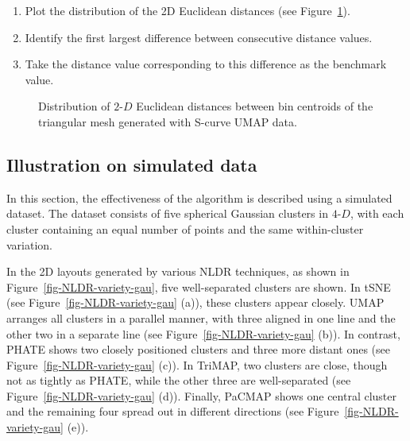 \documentclass[
  12pt]{article}
\providecommand{\tightlist}{%
  \setlength{\itemsep}{0pt}\setlength{\parskip}{0pt}}\usepackage{longtable,booktabs,array}
\def\tightlist{}
\begin{document}
\begin{enumerate}
\def\labelenumi{\arabic{enumi}.}
\tightlist
\item
  Plot the distribution of the 2D Euclidean distances (see
  Figure~\ref{fig-dist-scurve}).
\item
  Identify the first largest difference between consecutive distance
  values.
\item
  Take the distance value corresponding to this difference as the
  benchmark value.
\end{enumerate}

\begin{figure}[H]


\caption{\label{fig-dist-scurve}Distribution of \(2\text{-}D\) Euclidean
distances between bin centroids of the triangular mesh generated with
S-curve UMAP data.}

\end{figure}%

\subsection{Illustration on simulated
data}\label{illustration-on-simulated-data}

In this section, the effectiveness of the algorithm is described using a
simulated dataset. The dataset consists of five spherical Gaussian
clusters in \(4\text{-}D\), with each cluster containing an equal number
of points and the same within-cluster variation.

In the 2D layouts generated by various NLDR techniques, as shown in
Figure~\ref{fig-NLDR-variety-gau}, five well-separated clusters are
shown. In tSNE (see Figure~\ref{fig-NLDR-variety-gau} (a)), these
clusters appear closely. UMAP arranges all clusters in a parallel
manner, with three aligned in one line and the other two in a separate
line (see Figure~\ref{fig-NLDR-variety-gau} (b)). In contrast, PHATE
shows two closely positioned clusters and three more distant ones (see
Figure~\ref{fig-NLDR-variety-gau} (c)). In TriMAP, two clusters are
close, though not as tightly as PHATE, while the other three are
well-separated (see Figure~\ref{fig-NLDR-variety-gau} (d)). Finally,
PaCMAP shows one central cluster and the remaining four spread out in
different directions (see Figure~\ref{fig-NLDR-variety-gau} (e)).
\end{document}
